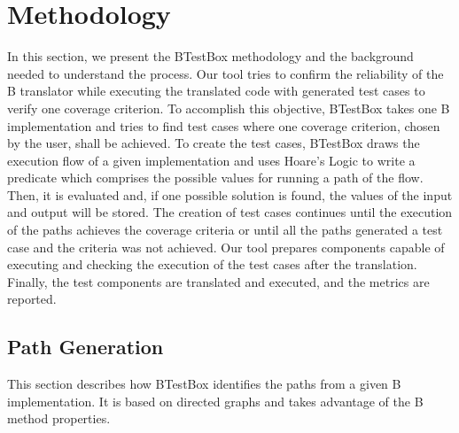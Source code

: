 \documentclass[runningheads]{llncs}
\begin{document}
\section{Methodology} \label{sec:BTestBox}

In this section, we present the BTestBox methodology and the background needed to understand the process. Our tool tries to confirm the reliability of the B translator while executing the translated code with generated test cases to verify one coverage criterion. To accomplish this objective, BTestBox takes one B implementation and tries to find test cases where one coverage criterion, chosen by the user, shall be achieved. To create the test cases, BTestBox draws the execution flow of a given implementation and uses Hoare's Logic to write a predicate which comprises the possible values for running a path of the flow. Then, it is evaluated and, if one possible solution is found, the values of the input and output will be stored. The creation of test cases continues until the execution of the paths achieves the coverage criteria or until all the paths generated a test case and the criteria was not achieved. Our tool prepares components capable of executing and checking the execution of the test cases after the translation. Finally, the test components are translated and executed, and the metrics are reported.

\subsection{Path Generation}

This section describes how BTestBox identifies the paths from a given B implementation. It is based on directed graphs and takes advantage of the B method properties. 



% 

\end{document}
